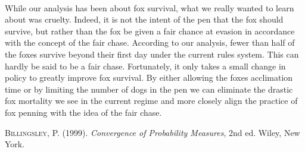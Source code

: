 \documentclass[aoas,preprint]{imsart}
\numberwithin{equation}{section}
\theoremstyle{plain}
\begin{document}
\paragraph{}While our analysis has been about fox survival, what we really wanted to learn about was cruelty. Indeed, it is not the intent of the pen that the fox should survive, but rather than the fox be given a fair chance at evasion in accordance with the concept of the fair chase. According to our analysis, fewer than half of the foxes survive beyond their first day under the current rules system. This can hardly be said to be a fair chase. Fortunately, it only takes a small change in policy to greatly improve fox survival. By either allowing the foxes acclimation time or by limiting the number of dogs in the pen we can eliminate the drastic fox mortality we see in the current regime and more closely align the practice of fox penning with the idea of the fair chase.













\begin{thebibliography}{9}

\textsc{Billingsley, P.} (1999). \textit{Convergence of
Probability Measures}, 2nd ed.
Wiley, New York.


\end{thebibliography}
\end{document}
